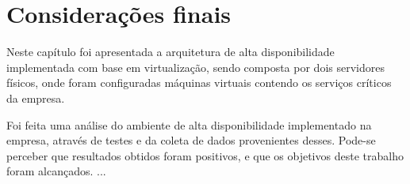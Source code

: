 \section{Considerações finais}

Neste capítulo foi apresentada a arquitetura de alta disponibilidade implementada com base em virtualização, sendo composta por dois servidores 
físicos, onde foram configuradas máquinas virtuais contendo os serviços críticos da empresa. 

Foi feita uma análise do ambiente de alta disponibilidade implementado na empresa, através de testes e da coleta de dados
provenientes desses. Pode-se perceber que resultados obtidos foram positivos, e que os objetivos deste trabalho foram alcançados. 
...
